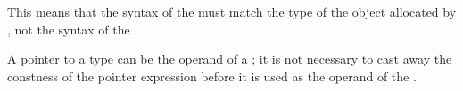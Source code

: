 %
%
\begin{note}
This means that the syntax of the  must
match the type of the object allocated by , not the syntax of the
.
\end{note}
\begin{note}
A pointer to a  type can be the operand of a
; it is not necessary to cast away the
constness of the pointer expression before it is
used as the operand of the .
\end{note}

